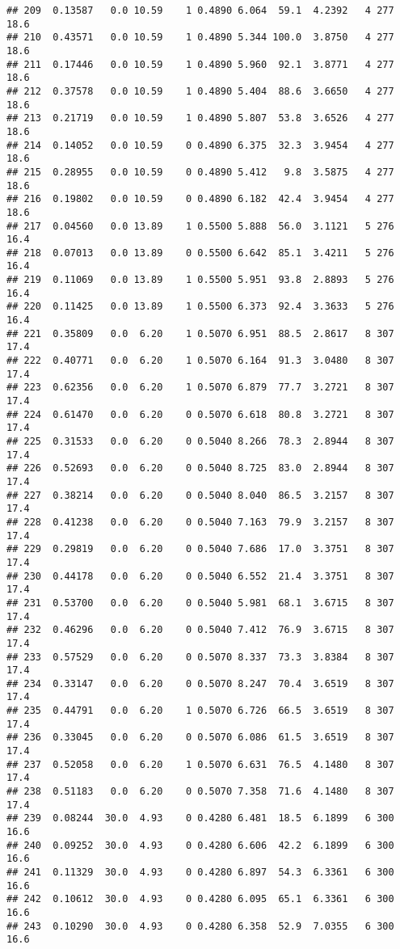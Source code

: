 \documentclass[]{article}
\begin{document}
\begin{verbatim}
## 209  0.13587   0.0 10.59    1 0.4890 6.064  59.1  4.2392   4 277    18.6
## 210  0.43571   0.0 10.59    1 0.4890 5.344 100.0  3.8750   4 277    18.6
## 211  0.17446   0.0 10.59    1 0.4890 5.960  92.1  3.8771   4 277    18.6
## 212  0.37578   0.0 10.59    1 0.4890 5.404  88.6  3.6650   4 277    18.6
## 213  0.21719   0.0 10.59    1 0.4890 5.807  53.8  3.6526   4 277    18.6
## 214  0.14052   0.0 10.59    0 0.4890 6.375  32.3  3.9454   4 277    18.6
## 215  0.28955   0.0 10.59    0 0.4890 5.412   9.8  3.5875   4 277    18.6
## 216  0.19802   0.0 10.59    0 0.4890 6.182  42.4  3.9454   4 277    18.6
## 217  0.04560   0.0 13.89    1 0.5500 5.888  56.0  3.1121   5 276    16.4
## 218  0.07013   0.0 13.89    0 0.5500 6.642  85.1  3.4211   5 276    16.4
## 219  0.11069   0.0 13.89    1 0.5500 5.951  93.8  2.8893   5 276    16.4
## 220  0.11425   0.0 13.89    1 0.5500 6.373  92.4  3.3633   5 276    16.4
## 221  0.35809   0.0  6.20    1 0.5070 6.951  88.5  2.8617   8 307    17.4
## 222  0.40771   0.0  6.20    1 0.5070 6.164  91.3  3.0480   8 307    17.4
## 223  0.62356   0.0  6.20    1 0.5070 6.879  77.7  3.2721   8 307    17.4
## 224  0.61470   0.0  6.20    0 0.5070 6.618  80.8  3.2721   8 307    17.4
## 225  0.31533   0.0  6.20    0 0.5040 8.266  78.3  2.8944   8 307    17.4
## 226  0.52693   0.0  6.20    0 0.5040 8.725  83.0  2.8944   8 307    17.4
## 227  0.38214   0.0  6.20    0 0.5040 8.040  86.5  3.2157   8 307    17.4
## 228  0.41238   0.0  6.20    0 0.5040 7.163  79.9  3.2157   8 307    17.4
## 229  0.29819   0.0  6.20    0 0.5040 7.686  17.0  3.3751   8 307    17.4
## 230  0.44178   0.0  6.20    0 0.5040 6.552  21.4  3.3751   8 307    17.4
## 231  0.53700   0.0  6.20    0 0.5040 5.981  68.1  3.6715   8 307    17.4
## 232  0.46296   0.0  6.20    0 0.5040 7.412  76.9  3.6715   8 307    17.4
## 233  0.57529   0.0  6.20    0 0.5070 8.337  73.3  3.8384   8 307    17.4
## 234  0.33147   0.0  6.20    0 0.5070 8.247  70.4  3.6519   8 307    17.4
## 235  0.44791   0.0  6.20    1 0.5070 6.726  66.5  3.6519   8 307    17.4
## 236  0.33045   0.0  6.20    0 0.5070 6.086  61.5  3.6519   8 307    17.4
## 237  0.52058   0.0  6.20    1 0.5070 6.631  76.5  4.1480   8 307    17.4
## 238  0.51183   0.0  6.20    0 0.5070 7.358  71.6  4.1480   8 307    17.4
## 239  0.08244  30.0  4.93    0 0.4280 6.481  18.5  6.1899   6 300    16.6
## 240  0.09252  30.0  4.93    0 0.4280 6.606  42.2  6.1899   6 300    16.6
## 241  0.11329  30.0  4.93    0 0.4280 6.897  54.3  6.3361   6 300    16.6
## 242  0.10612  30.0  4.93    0 0.4280 6.095  65.1  6.3361   6 300    16.6
## 243  0.10290  30.0  4.93    0 0.4280 6.358  52.9  7.0355   6 300    16.6

\end{verbatim}
\end{document}
